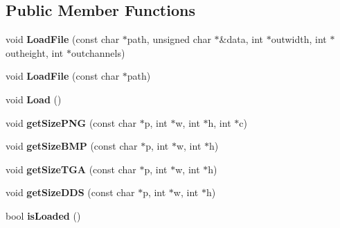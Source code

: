 \subsection*{Public Member Functions}
\begin{DoxyCompactItemize}
\item 
void {\bfseries Load\+File} (const char $\ast$path, unsigned char $\ast$\&data, int $\ast$outwidth, int $\ast$outheight, int $\ast$outchannels)\hypertarget{class_i_o_1_1_image_1_1_image_a05f99148e9bef11345479f217904f67d}{}\label{class_i_o_1_1_image_1_1_image_a05f99148e9bef11345479f217904f67d}

\item 
void {\bfseries Load\+File} (const char $\ast$path)\hypertarget{class_i_o_1_1_image_1_1_image_a5f5bcdb4e1a2e0931e26b568a28a2f5d}{}\label{class_i_o_1_1_image_1_1_image_a5f5bcdb4e1a2e0931e26b568a28a2f5d}

\item 
void {\bfseries Load} ()\hypertarget{class_i_o_1_1_image_1_1_image_a9f1a3f64b2ef92c54db583194a9f8091}{}\label{class_i_o_1_1_image_1_1_image_a9f1a3f64b2ef92c54db583194a9f8091}

\item 
void {\bfseries get\+Size\+P\+NG} (const char $\ast$p, int $\ast$w, int $\ast$h, int $\ast$c)\hypertarget{class_i_o_1_1_image_1_1_image_a1541631a67ad6872fa5c133b7a49e4af}{}\label{class_i_o_1_1_image_1_1_image_a1541631a67ad6872fa5c133b7a49e4af}

\item 
void {\bfseries get\+Size\+B\+MP} (const char $\ast$p, int $\ast$w, int $\ast$h)\hypertarget{class_i_o_1_1_image_1_1_image_a69b4e9d76b76809b4fdf18dd2a0a716b}{}\label{class_i_o_1_1_image_1_1_image_a69b4e9d76b76809b4fdf18dd2a0a716b}

\item 
void {\bfseries get\+Size\+T\+GA} (const char $\ast$p, int $\ast$w, int $\ast$h)\hypertarget{class_i_o_1_1_image_1_1_image_abe305d4223885aa9b8da93584ca94f2c}{}\label{class_i_o_1_1_image_1_1_image_abe305d4223885aa9b8da93584ca94f2c}

\item 
void {\bfseries get\+Size\+D\+DS} (const char $\ast$p, int $\ast$w, int $\ast$h)\hypertarget{class_i_o_1_1_image_1_1_image_a8a88ebfab83bb7625b2a9e0d363525d1}{}\label{class_i_o_1_1_image_1_1_image_a8a88ebfab83bb7625b2a9e0d363525d1}

\item 
bool {\bfseries is\+Loaded} ()\hypertarget{class_i_o_1_1_image_1_1_image_a58bb5e5fd453bab092bc37e2cb9b67e9}{}\label{class_i_o_1_1_image_1_1_image_a58bb5e5fd453bab092bc37e2cb9b67e9}


\end{DoxyCompactItemize}
